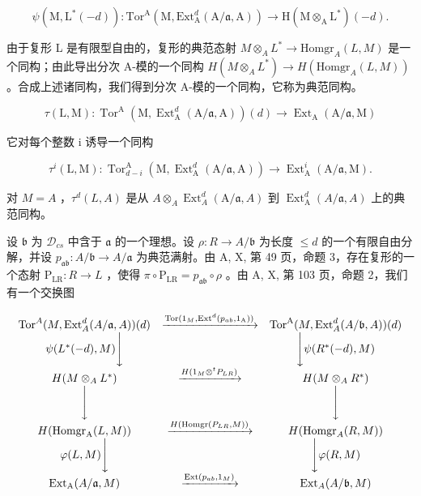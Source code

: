 \[
\psi (\mathrm{M}, \mathrm{L} ^ {*} (- d)): \mathrm{Tor} ^ {\mathrm{A}} (\mathrm{M}, \mathrm{Ext} _ {\mathrm{A}} ^ {d} (\mathrm{A} / \mathfrak {a}, \mathrm{A})) \to \mathrm{H} (\mathrm{M} \otimes_ {\mathrm{A}} \mathrm{L} ^ {*}) (- d).
\]

由于复形 L 是有限型自由的，复形的典范态射 \(M \otimes_{A} L^{*} \to \text{Homgr}_{A}(L, M)\) 是一个同构；由此导出分次 A-模的一个同构 \(H(M \otimes_{A} L^{*}) \to H(\text{Homgr}_{A}(L, M))\) 。合成上述诸同构，我们得到分次 A-模的一个同构，它称为典范同构。

\[
\tau (\mathrm{L}, \mathrm{M}): \operatorname{Tor} ^ {\mathrm{A}} (\mathrm{M}, \operatorname{Ext} _ {\mathrm{A}} ^ {d} (\mathrm{A} / \mathfrak {a}, \mathrm{A})) (d) \longrightarrow \operatorname{Ext} _ {\mathrm{A}} (\mathrm{A} / \mathfrak {a}, \mathrm{M})
\]

它对每个整数 i 诱导一个同构

\[
\tau^ {i} (\mathrm{L}, \mathrm{M}): \operatorname{Tor} _ {d - i} ^ {\mathrm{A}} (\mathrm{M}, \operatorname{Ext} _ {\mathrm{A}} ^ {d} (\mathrm{A} / \mathfrak {a}, \mathrm{A})) \longrightarrow \operatorname{Ext} _ {\mathrm{A}} ^ {i} (\mathrm{A} / \mathfrak {a}, \mathrm{M}).
\]

对 \(M = A\) ，\(\tau^d(L, A)\) 是从 \(A \otimes_A \operatorname{Ext}_A^d(\mathrm{A} / \mathfrak{a}, A)\) 到 \(\operatorname{Ext}_\mathrm{A}^d(A / \mathfrak{a}, A)\) 上的典范同构。

设 \(\mathfrak{b}\) 为 \(\mathcal{D}_{cs}\) 中含于 \(\mathfrak{a}\) 的一个理想。设 \(\rho: R \to A/\mathfrak{b}\) 为长度 \(\leqslant d\) 的一个有限自由分解，并设 \(p_{\mathfrak{ab}}: A/\mathfrak{b} \to A/\mathfrak{a}\) 为典范满射。由 A, X, 第 49 页，命题 3，存在复形的一个态射 \(\mathrm{P}_{\mathrm{LR}}: R \to L\) ，使得 \(\pi \circ \mathrm{P}_{\mathrm{LR}} = p_{\mathfrak{ab}} \circ \rho\) 。由 A, X, 第 103 页，命题 2，我们有一个交换图

\[
\begin{array}{c c c} \operatorname{Tor} ^ {A} (M, \operatorname{Ext} _ {A} ^ {d} (A / \mathfrak {a}, A)) (d) & \xrightarrow {\operatorname{Tor} (1 _ {M} , \operatorname{Ext} ^ {d} (p _ {a b} , 1 _ {\mathrm{A}}))} & \operatorname{Tor} ^ {\mathrm{A}} (M, \operatorname{Ext} _ {A} ^ {d} (A / \mathfrak {b}, A)) (d) \\ \psi (L ^ {*} (- d), M) \Bigg \downarrow & & \Bigg \downarrow \psi (R ^ {*} (- d), M) \\ H (M \otimes_ {A} L ^ {*}) & \xrightarrow {H (1 _ {M} \otimes^ {t} P _ {L R})} & H (M \otimes_ {A} R ^ {*}) \\ \Bigg \downarrow & & \Bigg \downarrow \\ H (\operatorname{Homgr} _ {\mathrm{A}} (L, M)) & \xrightarrow {H (\operatorname{Homgr} (P _ {L R} , M))} & H (\operatorname{Homgr} _ {A} (R, M)) \\ \varphi (L, M) \Bigg \downarrow & & \Bigg \downarrow \varphi (R, M) \\ \operatorname{Ext} _ {\mathrm{A}} (A / \mathfrak {a}, M) & \xrightarrow {\operatorname{Ext} (p _ {a b} , 1 _ {M})} & \operatorname{Ext} _ {A} (A / \mathfrak {b}, M) \end{array}
\]

